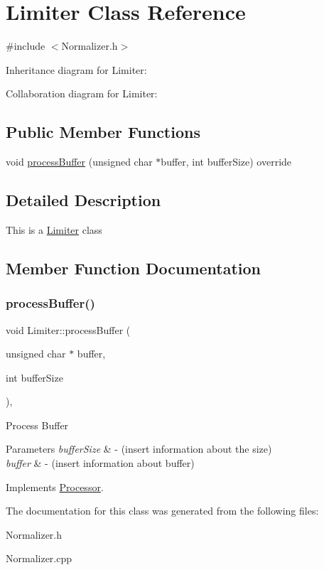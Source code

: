 \hypertarget{classLimiter}{}\section{Limiter Class Reference}
\label{classLimiter}


{\ttfamily \#include $<$Normalizer.\+h$>$}



Inheritance diagram for Limiter\+:


Collaboration diagram for Limiter\+:
\subsection*{Public Member Functions}
\begin{DoxyCompactItemize}
\item 
void \hyperlink{classLimiter_a7be62b79837918824c5a9c52b215d03d}{process\+Buffer} (unsigned char $\ast$buffer, int buffer\+Size) override
\end{DoxyCompactItemize}


\subsection{Detailed Description}
This is a \hyperlink{classLimiter}{Limiter} class 

\subsection{Member Function Documentation}
\mbox{\label{classLimiter_a7be62b79837918824c5a9c52b215d03d}} 
\subsubsection{\texorpdfstring{process\+Buffer()}{processBuffer()}}
{\footnotesize\ttfamily void Limiter\+::process\+Buffer (\begin{DoxyParamCaption}\item[{unsigned char $\ast$}]{buffer,  }\item[{int}]{buffer\+Size }\end{DoxyParamCaption})\hspace{0.3cm}{\ttfamily [override]}, {\ttfamily [virtual]}}

Process Buffer 
\begin{DoxyParams}{Parameters}
{\em buffer\+Size} & -\/ (insert information about the size) \\
\hline
{\em buffer} & -\/ (insert information about buffer) \\
\hline
\end{DoxyParams}


Implements \hyperlink{classProcessor_a401e57b59e43de9c4a51ca0f566d2948}{Processor}.



The documentation for this class was generated from the following files\+:\begin{DoxyCompactItemize}
\item 
Normalizer.\+h\item 
Normalizer.\+cpp\end{DoxyCompactItemize}
